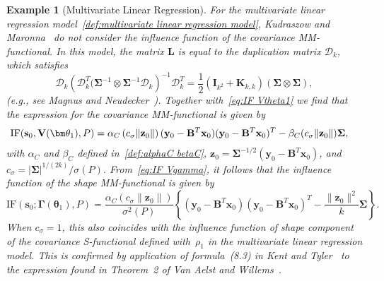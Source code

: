 \documentclass{article}
\numberwithin{equation}{section}
\theoremstyle{plain}
\newtheorem{example}{Example}
\newcommand{\btheta}{\bm\theta}
\newcommand{\bSigma}{\mathbf{\Sigma}}
\newcommand{\bGamma}{\bm\Gamma}
\newcommand{\by}{\mathbf{y}}
\newcommand{\bx}{\mathbf{x}}
\newcommand{\bs}{\mathbf{s}}
\newcommand{\bz}{\mathbf{z}}
\newcommand{\bV}{\mathbf{V}}
\newcommand{\bI}{\mathbf{I}}
\newcommand{\bB}{\mathbf{B}}
\newcommand{\bL}{\mathbf{L}}
\newcommand{\bK}{\mathbf{K}}
\begin{document}
\begin{example}[Multivariate Linear Regression]
For the multivariate linear regression model~\eqref{def:multivariate linear regression model}, 
Kudraszow and Maronna~\cite{kudraszow-maronna2011} do not consider the
influence function of the covariance MM-functional.
In this model, the matrix $\bL$ is equal to the duplication matrix $\mathcal{D}_k$,
which satisfies
\begin{equation}
\label{eq:prop duplication}
\mathcal{D}_k
\left(
\mathcal{D}_k^T(\bSigma^{-1}\otimes\bSigma^{-1}\mathcal{D}_k
\right)^{-1}
\mathcal{D}_k^T
=
\frac12
\left(
\bI_{k^2}+\bK_{k,k}
\right)(\bSigma\otimes\bSigma),
\end{equation}
(e.g., see Magnus and Neudecker~\cite[Ch.~3, Sec.~8]{magnus&neudecker1988}).
Together with~\eqref{eq:IF Vtheta1} we find that the expression for
the covariance MM-functional is given by
\begin{equation}
\label{eq:IF cov MM mult lin regr}
\begin{split}
\text{\rm IF}(\bs_0,\bV(\btheta_1),P)
&=
\alpha_C\left(c_\sigma\|\bz_0\|\right)
(\by_0-\bB^T\bx_0)(\by_0-\bB^T\bx_0)^T
-
\beta_C(c_\sigma\|\bz_0\|)
\bSigma,
\end{split}
\end{equation}
with $\alpha_C$ and $\beta_C$ defined in~\eqref{def:alphaC betaC},
$\bz_0=\bSigma^{-1/2}(\by_0-\bB^T\bx_0)$, and $c_\sigma=|\bSigma|^{1/(2k)}/\sigma(P)$.
From~\eqref{eq:IF Vgamma}, it follows that 
the influence function of the shape MM-functional is given by
\begin{equation}
\label{eq:IF shape MM mult lin regr}
\text{IF}(\bs_0;\bGamma(\btheta_1),P)
=
\frac{\alpha_C\left(c_\sigma\|\bz_0\|\right)}{\sigma^2(P)}
\left\{
(\by_0-\bB^T\bx_0)(\by_0-\bB^T\bx_0)^T
-
\frac{\|\bz_0\|^2}{k}\bSigma
\right\}.
\end{equation}
When $c_\sigma=1$, 
this also coincides with the influence function of
shape component of the covariance S-functional defined with~$\rho_1$ in the 
multivariate linear regression model.
This is confirmed by application of formula~(8.3) in Kent and Tyler~\cite{kent&tyler1996}
to the expression found in Theorem~2 of Van Aelst and Willems~\cite{vanaelst&willems2005}.
\end{example}
\end{document}
